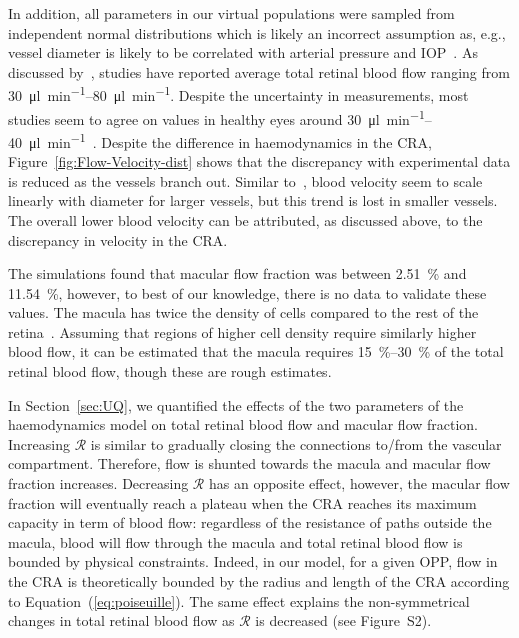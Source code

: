 \documentclass[11pt,]{article}
\begin{document}
In addition, all parameters in our virtual populations were sampled from independent normal distributions which is likely an incorrect assumption as, e.g., vessel diameter is likely to be correlated with arterial pressure and IOP~\cite{Dziedziak_2022}.
As discussed by~\cite{DoblhoffDier2014}, studies have reported average total retinal blood flow ranging from \SIrange[per-mode=symbol]{30}{80}{\micro\litre\per\minute}\cite{DoblhoffDier2014,Riva1985,Feke_1989}.
Despite the uncertainty in measurements, most studies seem to agree on values in healthy eyes around \SIrange{30}{40}{\micro\litre\per\minute}~\cite{DoblhoffDier2014,Riva1985}.
Despite the difference in haemodynamics in the CRA, Figure~\ref{fig:Flow-Velocity-dist} shows that the discrepancy with experimental data is reduced as the vessels branch out.
Similar to~\cite{DoblhoffDier2014}, blood velocity seem to scale linearly with diameter for larger vessels, but this trend is lost in smaller vessels.
The overall lower blood velocity can be attributed, as discussed above, to the discrepancy in velocity in the CRA.

The simulations found that macular flow fraction was between \SI{2.51}{\percent} and \SI{11.54}{\percent}, however, to best of our knowledge, there is no data to validate these values.
The macula has twice the density of cells compared to the rest of the retina~\cite{Zouache2022}.
Assuming that regions of higher cell density require similarly higher blood flow, it can be estimated that the macula requires \SIrange{15}{30}{\percent} of the total retinal blood flow, though these are rough estimates.

In Section~\ref{sec:UQ}, we quantified the effects of the two parameters of the haemodynamics model on total retinal blood flow and macular flow fraction.
Increasing $\mathcal R$ is similar to gradually closing the connections to/from the vascular compartment.
Therefore, flow is shunted towards the macula and macular flow fraction increases.
Decreasing $\mathcal R$ has an opposite effect, however, the macular flow fraction will eventually reach a plateau when the CRA reaches its maximum capacity in term of blood flow: regardless of the resistance of paths outside the macula, blood will flow through the macula and total retinal blood flow is bounded by physical constraints.
Indeed, in our model, for a given OPP, flow in the CRA is theoretically bounded by the radius and length of the CRA according to Equation~(\ref{eq:poiseuille}).
The same effect explains the non-symmetrical changes in total retinal blood flow as $\mathcal R$ is decreased (see Figure~S2). %
\end{document}
